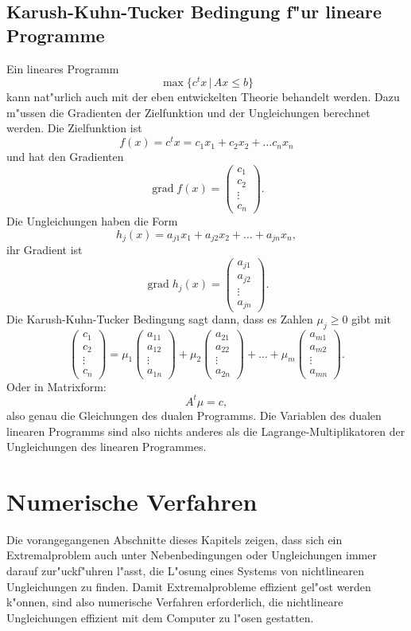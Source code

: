 \subsection{Karush-Kuhn-Tucker Bedingung f"ur lineare Programme}
Ein lineares Programm
\[
\max\{ c^tx\,|\,Ax\le b\}
\]
kann nat"urlich auch mit der eben entwickelten Theorie behandelt
werden.
Dazu m"ussen die Gradienten der Zielfunktion und der Ungleichungen
berechnet werden. Die Zielfunktion ist
\[
f(x)=c^tx=c_1x_1+c_2x_2+\dots c_nx_n
\]
und hat den Gradienten
\[
\operatorname{grad}f(x)
=
\begin{pmatrix}c_1\\c_2\\\vdots\\c_n\end{pmatrix}.
\]
Die Ungleichungen haben die Form
\[
h_j(x)=a_{j1}x_1+a_{j2}x_2+\dots+a_{jn}x_n,
\]
ihr Gradient ist
\[
\operatorname{grad}h_j(x)
=
\begin{pmatrix}a_{j1}\\a_{j2}\\\vdots\\a_{jn}\end{pmatrix}.
\]
Die Karush-Kuhn-Tucker Bedingung sagt dann, dass es Zahlen $\mu_j\ge 0$
gibt mit 
\[
\begin{pmatrix}c_1\\c_2\\\vdots\\c_n\end{pmatrix}
=
\mu_1\begin{pmatrix}a_{11}\\a_{12}\\\vdots\\a_{1n}\end{pmatrix}
+
\mu_2\begin{pmatrix}a_{21}\\a_{22}\\\vdots\\a_{2n}\end{pmatrix}
+\dots+
\mu_m\begin{pmatrix}a_{m1}\\a_{m2}\\\vdots\\a_{mn}\end{pmatrix}.
\]
Oder in Matrixform:
\[
A^t\mu=c,
\]
also genau die Gleichungen des dualen Programms.
Die Variablen des dualen linearen Programms sind also nichts anderes
als die Lagrange-Multiplikatoren der Ungleichungen des linearen
Programmes.
\section{Numerische Verfahren}
Die vorangegangenen Abschnitte dieses Kapitels zeigen, dass
sich ein Extremalproblem auch unter Nebenbedingungen oder Ungleichungen
immer darauf zur"uckf"uhren l"asst, die L"osung eines Systems von
nichtlinearen Ungleichungen zu finden.
Damit Extremalprobleme effizient gel"ost werden k"onnen, sind also
numerische Verfahren erforderlich, die nichtlineare Ungleichungen
effizient mit dem Computer zu l"osen gestatten.

